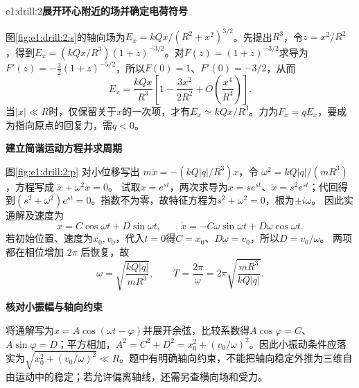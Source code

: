 \begin{drillsolution}{e1:drill:2}\textbf{展开环心附近的场并确定电荷符号}\par\nobreak
图\ref{fig:e1:drill:2:s}的轴向场为$E_x=kQx/(R^2+x^2)^{3/2}$。先提出$R^3$，令$z=x^2/R^2$，得到$E_x=(kQx/R^3)(1+z)^{-3/2}$。对$F(z)=(1+z)^{-3/2}$求导为$F'(z)=-\tfrac32(1+z)^{-5/2}$，所以$F(0)=1$、$F'(0)=-3/2$，从而
\[
E_x=\frac{kQx}{R^3}\left[1-\frac{3x^2}{2R^2}
+O\!\left(\frac{x^4}{R^4}\right)\right].
\]
当$|x|\ll R$时，仅保留关于$x$的一次项，才有$E_x\simeq kQx/R^3$。力为$F_x=qE_x$，要成为指向原点的回复力，需$q<0$。



\par\medskip{}\noindent\textbf{建立简谐运动方程并求周期}\par\nobreak
图\ref{fig:e1:drill:2:p} 对小位移写出 $m\ddot x=-(kQ|q|/R^3)x$，令 $\omega^2=kQ|q|/(mR^3)$，方程写成 $\ddot x+\omega^2x=0$。
试取$x=e^{st}$，两次求导为$\dot x=se^{st}$、$\ddot x=s^2e^{st}$；代回得到$(s^2+\omega^2)e^{st}=0$。指数不为零，故特征方程为$s^2+\omega^2=0$，根为$\pm i\omega$。
因此实通解及速度为
\[
x=C\cos\omega t+D\sin\omega t,\qquad
\dot x=-C\omega\sin\omega t+D\omega\cos\omega t.
\]
若初始位置、速度为$x_0,v_0$，代入$t=0$得$C=x_0$、$D\omega=v_0$，所以$D=v_0/\omega$。
两项都在相位增加 $2\pi$ 后恢复，故
\[
 \omega=\sqrt{\frac{kQ|q|}{mR^3}},\qquad
 T=\frac{2\pi}{\omega}=2\pi\sqrt{\frac{mR^3}{kQ|q|}}.
\]


\par\medskip{}\noindent\textbf{核对小振幅与轴向约束}\par\nobreak
将通解写为$x=A\cos(\omega t-\varphi)$并展开余弦，比较系数得$A\cos\varphi=C$、$A\sin\varphi=D$；平方相加，$A^2=C^2+D^2=x_0^2+(v_0/\omega)^2$。因此小振动条件应落实为$\sqrt{x_0^2+(v_0/\omega)^2}\ll R$。题中有明确轴向约束，不能把轴向稳定外推为三维自由运动中的稳定；若允许偏离轴线，还需另查横向场和受力。\end{drillsolution}

